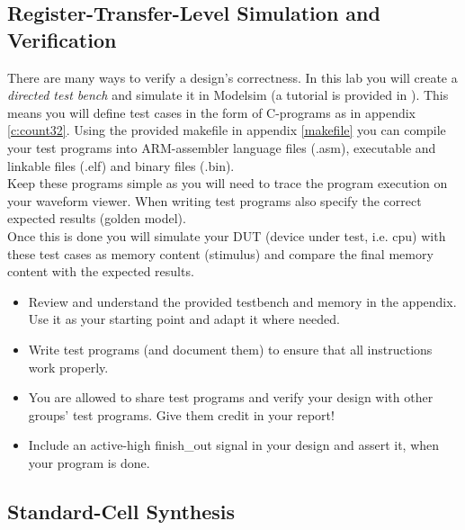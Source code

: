 \subsection{Register-Transfer-Level Simulation and Verification}
There are many ways to verify a design's correctness. In this lab you will create a \textit{directed test bench} and simulate it in Modelsim (a tutorial is provided in \cite{mentor}). This means you will define test cases in the form of C-programs as in appendix \ref{c:count32}. Using the provided makefile in appendix \ref{makefile} you can compile your test programs into ARM-assembler language files (.asm), executable and linkable files (.elf) and binary files (.bin).\\
Keep these programs simple as you will need to trace the program execution on your waveform viewer. When writing test programs also specify the correct expected results (golden model).\\
Once this is done you will simulate your DUT (device under test, i.e. cpu) with these test cases as memory content (stimulus) and compare the final memory content with the expected results.\\
\begin{itemize}
\item Review and understand the provided testbench and memory in the appendix. Use it as your starting point and adapt it where needed.
\item Write test programs (and document them) to ensure that all instructions work properly.
\item You are allowed to share test programs and verify your design with other groups' test programs. Give them credit in your report!
\item Include an active-high finish\_out signal in your design and assert it, when your program is done.
\end{itemize}

\subsection{Standard-Cell Synthesis}
